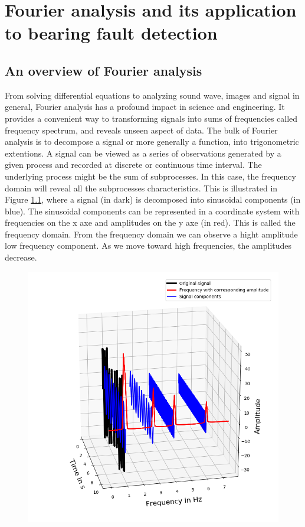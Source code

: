 \documentclass[../Main/thesis.tex]{subfiles}
\begin{document}
\chapter[Fourier analysis and its application to bearing fault detection]{Fourier analysis and its application to bearing fault detection}
\label{sec:chapter2}

\section{An overview of Fourier analysis}
From solving differential equations to analyzing sound wave, images and signal in general, Fourier analysis has a profound impact in science and engineering. It provides a convenient way to transforming signals into sums of frequencies called frequency spectrum, and reveals unseen aspect of data. The bulk of Fourier analysis is to decompose a signal or more generally a function, into trigonometric extentions. 
\justify
 A signal can be viewed as a series of observations generated by a given process and recorded at discrete or continuous time interval. The underlying process might be the sum of subprocesses. In this case, the frequency domain will reveal all the subprocesses characteristics.
This is illustrated in Figure \ref{fig:fft_domain}, where a signal (in dark) is decomposed into sinusoidal components (in blue). The sinusoidal components can be represented in a coordinate system with frequencies on the x axe and amplitudes on the y axe (in red). This is called the frequency domain. From the frequency domain we can observe a hight amplitude low frequency component. As we move toward high frequencies, the amplitudes decrease.
\begin{figure}[H] %
   \centering
   \includegraphics[width=6in]{../fig/fft_domain} 
   \caption{}
   \label{fig:fft_domain}
\end{figure}
\end{document}
